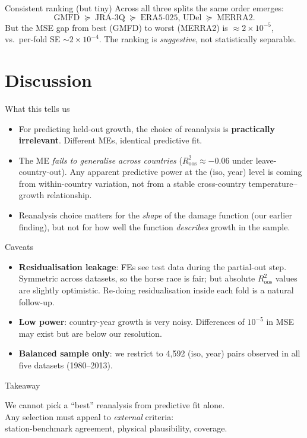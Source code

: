\documentclass[10pt,aspectratio=169]{beamer}
\begin{document}
\begin{frame}{Consistent ranking (but tiny)}
  Across all three splits the same order emerges:
  \[
    \text{GMFD} \;\succeq\; \text{JRA-3Q} \;\succeq\; \text{ERA5-025, UDel}
                    \;\succeq\; \text{MERRA2}.
  \]
  \vspace{0.3em}
  But the MSE gap from best (GMFD) to worst (MERRA2) is
  $\approx 2 \times 10^{-5}$, vs.\ per-fold SE $\sim 2 \times 10^{-4}$. The
  ranking is \emph{suggestive}, not statistically separable.
\end{frame}

\section{Discussion}

\begin{frame}{What this tells us}
  \begin{itemize}
    \item For predicting held-out growth, the choice of reanalysis is
          \textbf{practically irrelevant}. Different MEs, identical predictive fit.
    \item The ME \emph{fails to generalise across countries}
          ($R^2_{\text{oos}} \approx -0.06$ under leave-country-out).
          Any apparent predictive power at the (iso, year) level is coming
          from within-country variation, not from a stable cross-country
          temperature--growth relationship.
    \item Reanalysis choice matters for the \emph{shape} of the damage function
          (our earlier finding), but not for how well the function
          \emph{describes} growth in the sample.
  \end{itemize}
\end{frame}

\begin{frame}{Caveats}
  \begin{itemize}
    \item \textbf{Residualisation leakage}: FEs see test data during the
          partial-out step. Symmetric across datasets, so the horse race is
          fair; but absolute $R^2_{\text{oos}}$ values are slightly optimistic.
          Re-doing residualisation inside each fold is a natural follow-up.
    \item \textbf{Low power}: country-year growth is very noisy.
          Differences of $10^{-5}$ in MSE may exist but are below our
          resolution.
    \item \textbf{Balanced sample only}: we restrict to 4{,}592 (iso, year)
          pairs observed in all five datasets (1980--2013).
  \end{itemize}
\end{frame}

\begin{frame}{Takeaway}
  \begin{center}\Large
    We cannot pick a ``best'' reanalysis from predictive fit alone.\\[0.6em]
    Any selection must appeal to \emph{external} criteria:\\[0.3em]
    station-benchmark agreement, physical plausibility, coverage.
  \end{center}
\end{frame}
\end{document}
